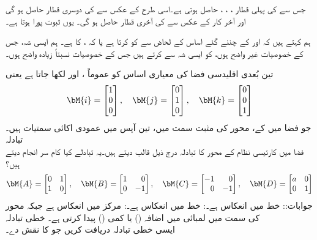 جس سے  کی پہلی قطار ، ، ،   حاصل ہوتی ہے۔اسی طرح  کے عکس سے  کی دوسری قطار حاصل ہو گی اور آخر کار  کے عکس سے  کی آخری قطار حاصل ہو گی۔ یوں ثبوت پورا ہوتا ہے۔

ہم کہتے ہیں کہ  اور  کے چننے گئے  اساس کے لحاض سے    کو   کرتا ہے  یا کہ ،  کا  ہے۔ ہم  ایسی شہ، جس کے خصوصیات غیر واضح ہوں، کو ایسی شہ سے  کرتے ہیں جس کے خصوصیات نسبتاً زیادہ واضح ہوں۔

تین بُعدی اقلیدسی فضا  کی معیاری اساس کو عموماً ،  اور  لکھا جاتا ہے یعنی
\begin{align}
\bM{i}=\begin{bmatrix} 1\\0\\0 \end{bmatrix},\quad \bM{j}=\begin{bmatrix}0\\1\\0  \end{bmatrix}, \quad \bM{k}=\begin{bmatrix}0\\0\\1  \end{bmatrix}
\end{align}
جو فضا میں  کے، محور کی مثبت سمت میں، تین آپس میں عمودی اکائی سمتیات ہیں۔
\quad تبادلہ\\
فضا میں کارتیسی نظام کے محور کا تبادلہ درج ذیل قالب دیتے ہیں۔یہ تبادلے کیا کام سر انجام دیتے ہیں؟
\begin{align*}
\bM{A}=\begin{bmatrix*}[r]0&1\\1&0  \end{bmatrix*}, \quad \bM{B}=\begin{bmatrix*}[r]1&0\\0&-1  \end{bmatrix*}, \quad \bM{C}=\begin{bmatrix*}[r]-1&0\\0&-1  \end{bmatrix*}, \quad \bM{D}=\begin{bmatrix*}[r]a&0\\0&1  \end{bmatrix*}
\end{align*}
جوابات:: خط  میں انعکاس ہے۔: خط  میں انعکاس ہے۔: مرکز میں انعکاس ہے جبکہ  محور  کی سمت میں لمبائی میں اضافہ () یا کمی () پیدا کرتی ہے۔  
\quad خطی تبادلہ\\
ایسی خطی تبادلہ دریافت کریں جو   کا نقش  دے۔

